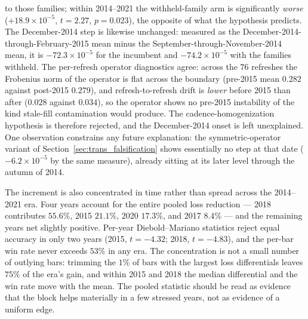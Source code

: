 to those families; within 2014--2021 the withheld-family arm is
significantly \emph{worse} ($+18.9 \times 10^{-5}$, $t = 2.27$,
$p = 0.023$), the opposite of what the hypothesis predicts. The
December-2014 step is likewise unchanged: measured as the
December-2014-through-February-2015 mean minus the
September-through-November-2014 mean, it is $-72.3 \times 10^{-5}$ for
the incumbent and $-74.2 \times 10^{-5}$ with the families withheld. The
per-refresh operator diagnostics agree: across the $76$ refreshes the
Frobenius norm of the operator is flat across the boundary (pre-2015 mean
$0.282$ against post-2015 $0.279$), and refresh-to-refresh drift is
\emph{lower} before 2015 than after ($0.028$ against $0.034$), so the
operator shows no pre-2015 instability of the kind stale-fill
contamination would produce. The cadence-homogenization hypothesis is
therefore rejected, and the December-2014 onset is left unexplained. One
observation constrains any future explanation: the symmetric-operator
variant of Section~\ref{sec:trans_falsification} shows essentially no
step at that date ($-6.2 \times 10^{-5}$ by the same measure), already
sitting at its later level through the autumn of 2014.

The increment is also concentrated in time rather than spread across the
2014--2021 era. Four years account for the entire pooled loss reduction
--- 2018 contributes $55.6\%$, 2015 $21.1\%$, 2020 $17.3\%$, and 2017
$8.4\%$ --- and the remaining years net slightly positive. Per-year
Diebold--Mariano statistics reject equal accuracy in only two years
(2015, $t = -4.32$; 2018, $t = -4.83$), and the per-bar win rate never
exceeds $53\%$ in any era. The concentration is not a small number of
outlying bars: trimming the $1\%$ of bars with the largest loss
differentials leaves $75\%$ of the era's gain, and within 2015 and 2018
the median differential and the win rate move with the mean. The pooled
statistic should be read as evidence that the block helps materially in a
few stressed years, not as evidence of a uniform edge.

